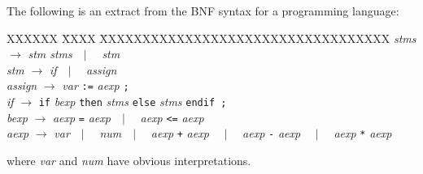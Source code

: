 
\question

\newenvironment{bnf}{
    \begin{tabbing}
    XXXXXX \= XXXX \= XXXXXXXXXXXXXXXXXXXXXXXXXXXXXXXXXX\kill}{
    \end{tabbing}
    }

\newcommand{\nt}[1]{{\it #1\/}}
\newcommand{\Or}[1]{\ \ $|$ \ \ #1}
\newcommand{\Rule}[2]{{\it #1} \> $\rightarrow$ \> #2}


The following is an extract from the BNF syntax for
a programming language:
\begin{bnf}
\Rule{\nt{stms}}{\nt{stm stms}\Or{\nt{stm}}} \\
\Rule{\nt{stm}}{\nt{if}\Or{\nt{assign}}} \\
\Rule{\nt{assign}}{\nt{var} \verb":=" \nt{aexp} \verb";"} \\
\Rule{\nt{if}}{\verb"if" \nt{bexp} \verb"then" \nt{stms} \verb"else" \nt{stms} \verb"endif ;"}\\
\Rule{\nt{bexp}}{\nt{aexp} \verb"=" \nt{aexp}\Or{\nt{aexp} \verb"<=" \nt{aexp}}}\\
\Rule{\nt{aexp}}{\nt{var}\Or{\nt{num}}\Or{\nt{aexp} \verb"+" \nt{aexp}}
        \Or{\nt{aexp} \verb"-" \nt{aexp}} \Or{\nt{aexp} \verb"*" \nt{aexp}}}
\end{bnf}
where \nt{var} and \nt{num} have obvious interpretations.
